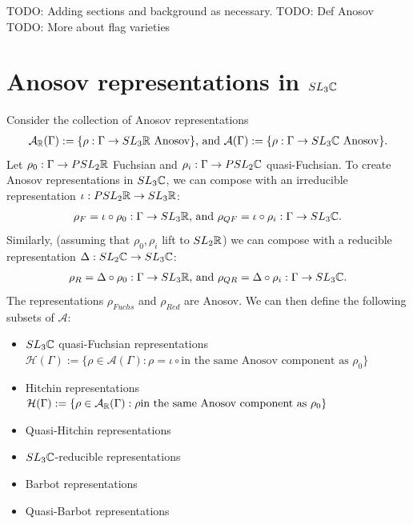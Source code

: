 TODO: Adding sections and background as necessary. 
TODO: Def Anosov
TODO: More about flag varieties

\section{Anosov representations in $SL_3\mathbb{C}$}

Consider the collection of Anosov representations 
\begin{align}
    \mathcal{A}_{\mathbb{R}}(\Gamma) := \{\rho:\Gamma \rightarrow SL_3\mathbb{R} \text{ Anosov}\}\text{, and }
    \mathcal{A}(\Gamma) := \{\rho:\Gamma \rightarrow SL_3\mathbb{C} \text{ Anosov}\}.
\end{align}
Let $\rho_0 : \Gamma \rightarrow PSL_2\mathbb{R}$ Fuchsian and 
$\rho_i : \Gamma \rightarrow PSL_2\mathbb{C}$ quasi-Fuchsian. 
To create Anosov representations in $SL_3\mathbb{C}$, 
we can compose with an irreducible representation $\iota : PSL_2\mathbb{R} \rightarrow SL_3\mathbb{R}$:
\begin{align}
    \rho_{F} = \iota \circ \rho_0 : \Gamma \rightarrow SL_3\mathbb{R}\text{, and }
    \rho_{QF} = \iota \circ \rho_i : \Gamma \rightarrow SL_3\mathbb{C}.
\end{align}
Similarly, (assuming that $\rho_0,\rho_i$ lift to $SL_2\mathbb{R}$) 
we can compose with a reducible representation 
$\Delta : SL_2\mathbb{C} \rightarrow SL_3\mathbb{C}$:
\begin{align}
    \rho_{R} = \Delta \circ \rho_0 : \Gamma \rightarrow SL_3\mathbb{R}\text{, and }
    \rho_{QR} = \Delta \circ \rho_i : \Gamma \rightarrow SL_3\mathbb{C}.
\end{align}
The representations $\rho_{Fuchs}$ and $\rho_{Red}$ are Anosov. 
We can then define the following subsets of $\mathcal{A}$:
\begin{itemize}
    \item $SL_3\mathbb{C}$ quasi-Fuchsian representations
    $\mathcal{H}(\Gamma) := \{\rho \in \mathcal{A}(\Gamma) : \rho = \iota \circ  \text{in the same Anosov component as }\rho_0\}$
    \item Hitchin representations 
    $\mathcal{H}(\Gamma) := \{\rho \in \mathcal{A}_{\mathbb{R}}(\Gamma) : \rho \text{in the same Anosov component as }\rho_0\}$
    \item Quasi-Hitchin representations
    \item $SL_3\mathbb{C}$-reducible representations
    \item Barbot representations
    \item Quasi-Barbot representations
\end{itemize}

